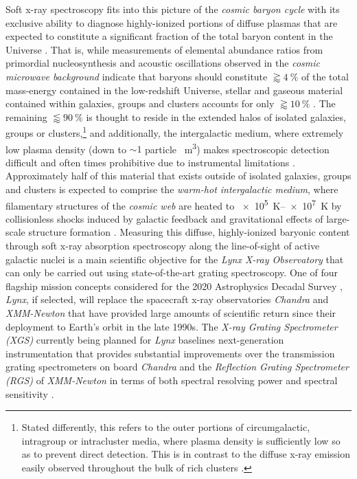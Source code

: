 Soft x-ray spectroscopy fits into this picture of the \emph{cosmic baryon cycle} with its exclusive ability to diagnose highly-ionized portions of diffuse plasmas that are expected to constitute a significant fraction of the total baryon content in the Universe \cite{Persic92,Bregman07,McGaugh10}. 
That is, while measurements of elemental abundance ratios from primordial nucleosynthesis \cite{Kirkman03} and acoustic oscillations observed in the \emph{cosmic microwave background} \cite{Komatsu09,Planck_collab} indicate that baryons should constitute $\gtrapprox \SI{4}{\percent}$ of the total mass-energy contained in the low-redshift Universe, stellar and gaseous material contained within galaxies, groups and clusters accounts for only $\gtrapprox \SI{10}{\percent}$ \cite{Persic92,Fukugita_2004,Bregman07}. 
The remaining $\lessapprox \SI{90}{\percent}$ is thought to reside in the extended halos of isolated galaxies, groups or clusters,\footnote{Stated differently, this refers to the outer portions of circumgalactic, intragroup or intracluster media, where plasma density is sufficiently low so as to prevent direct detection. This is in contrast to the diffuse x-ray emission easily observed throughout the bulk of rich clusters \cite{Sarazin86}.} and additionally, the intergalactic medium, where extremely low plasma density (down to $\sim 1$ particle \si{\per\metre\cubed}) makes spectroscopic detection difficult and often times prohibitive due to instrumental limitations \cite{Fukugita_2004,Bregman07,Shull12}. 
Approximately half of this material that exists outside of isolated galaxies, groups and clusters is expected to comprise the \emph{warm-hot intergalactic medium}, where filamentary structures of the \emph{cosmic web} are heated to \SIrange{e5}{e7}{\kelvin} by collisionless shocks induced by galactic feedback and gravitational effects of large-scale structure formation \cite{Cen99,Dave01,Nicastro05b,Nicastro08,Bykov08,deGraaff19}. 
Measuring this diffuse, highly-ionized baryonic content through soft x-ray absorption spectroscopy along the line-of-sight of active galactic nuclei is a main scientific objective for the \emph{Lynx X-ray Observatory} \cite{Lynx_web} that can only be carried out using state-of-the-art grating spectroscopy. 
One of four flagship mission concepts considered for the 2020 Astrophysics Decadal Survey \cite{Gaskin19,Gaskin15}, \emph{Lynx}, if selected, will replace the spacecraft x-ray observatories \emph{Chandra} \cite{Weisskopf00} and \emph{XMM-Newton} \cite{Jansen01,Lumb12} that have provided large amounts of scientific return since their deployment to Earth's orbit in the late 1990s. 
The \emph{X-ray Grating Spectrometer (XGS)} currently being planned for \emph{Lynx} baselines next-generation instrumentation that provides substantial improvements over the transmission grating spectrometers on board \emph{Chandra} \cite{Canizares05,Brinkman00} and the \emph{Reflection Grating Spectrometer (RGS)} of \emph{XMM-Newton} \cite{Kahn96,denHerder01} in terms of both spectral resolving power and spectral sensitivity \cite{McEntaffer19,Gunther19}. 

